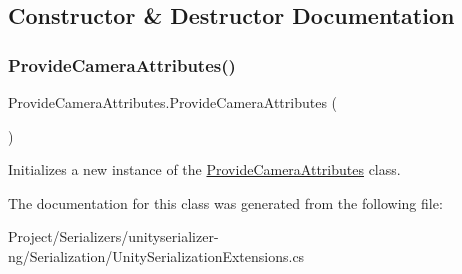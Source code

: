 \subsection{Constructor \& Destructor Documentation}
\mbox{\label{class_provide_camera_attributes_a4813f670349ffbfc7c99dda6ab4b8cb1}} 
\subsubsection{\texorpdfstring{Provide\+Camera\+Attributes()}{ProvideCameraAttributes()}}
{\footnotesize\ttfamily Provide\+Camera\+Attributes.\+Provide\+Camera\+Attributes (\begin{DoxyParamCaption}{ }\end{DoxyParamCaption})\hspace{0.3cm}{\ttfamily [inline]}}



Initializes a new instance of the \hyperlink{class_provide_camera_attributes}{Provide\+Camera\+Attributes} class. 



The documentation for this class was generated from the following file\+:\begin{DoxyCompactItemize}
\item 
Project/\+Serializers/unityserializer-\/ng/\+Serialization/Unity\+Serialization\+Extensions.\+cs\end{DoxyCompactItemize}
